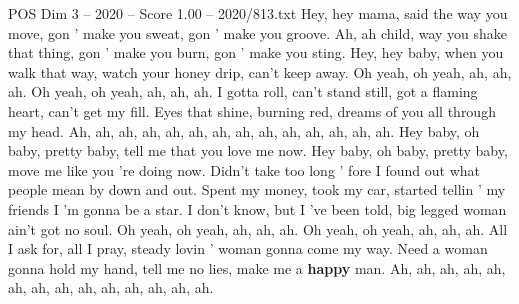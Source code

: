 \begin{textsample}{POS Dim 3 – 2020 – Score 1.00 – 2020/813.txt}  \label{ex:f3_pos_012}
Hey, hey mama, said the way you move, gon ' make you sweat, gon ' make you groove.
Ah, ah child, way you shake that thing, gon ' make you burn, gon ' make you sting.
Hey, hey baby, when you walk that way, watch your honey drip, can't keep away.
Oh yeah, oh yeah, ah, ah, ah.
Oh yeah, oh yeah, ah, ah, ah.
I gotta roll, can't stand still, got a flaming heart, can't get my fill.
Eyes that shine, burning red, dreams of you all through my head.
Ah, ah, ah, ah, ah, ah, ah, ah, ah, ah, ah, ah, ah, ah.
Hey baby, oh baby, pretty baby, tell me that you love me now.
Hey baby, oh baby, pretty baby, move me like you 're doing now.
Didn't take too long ' fore I found out what people mean by down and out.
Spent my money, took my car, started tellin ' my friends I 'm gonna be a star.
I don't know, but I 've been told, big legged woman ain't got no soul.
Oh yeah, oh yeah, ah, ah, ah.
Oh yeah, oh yeah, ah, ah, ah.
All I ask for, all I pray, steady lovin ' woman gonna come my way.
Need a woman gonna hold my hand, tell me no lies, make me a \textbf{happy} man.
Ah, ah, ah, ah, ah, ah, ah, ah, ah, ah, ah, ah, ah, ah.

\end{textsample}
